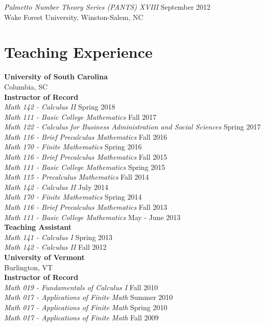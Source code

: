 \documentclass{article}
\begin{document}
  \noindent\textsl{Palmetto Number Theory Series (PANTS) XVIII} \hfill September 2012\\
  Wake Forest University, Winston-Salem, NC\\

  \section*{Teaching Experience}
  \textbf{University of South Carolina}\\Columbia, SC\\
  
  \noindent\textbf{Instructor of Record}\\
  \textsl{Math 142 - Calculus II} \hfill Spring 2018\\
  \textsl{Math 111 - Basic College Mathematics} \hfill Fall 2017\\
  \textsl{Math 122 - Calculus for Business Administration and Social Sciences} \hfill Spring 2017\\
  \textsl{Math 116 - Brief Precalculus Mathematics} \hfill Fall 2016\\
  \textsl{Math 170 - Finite Mathematics} \hfill Spring 2016\\
  \textsl{Math 116 - Brief Precalculus Mathematics} \hfill Fall 2015\\
  \textsl{Math 111 - Basic College Mathematics} \hfill Spring 2015\\
  \textsl{Math 115 - Precalculus Mathematics} \hfill Fall 2014\\
  \textsl{Math 142 - Calculus II} \hfill July 2014\\
  \textsl{Math 170 - Finite Mathematics} \hfill Spring 2014\\
  \textsl{Math 116 - Brief Precalculus Mathematics} \hfill Fall 2013\\
  \textsl{Math 111 - Basic College Mathematics} \hfill May - June 2013\\

  \noindent\textbf{Teaching Assistant}\\
  \textsl{Math 141 - Calculus I} \hfill Spring 2013\\
  \textsl{Math 142 - Calculus II} \hfill Fall 2012\\

  \noindent\textbf{University of Vermont}\\Burlington, VT\\
  
  \noindent\textbf{Instructor of Record}\\
  \textsl{Math 019 - Fundamentals of Calculus I} \hfill Fall 2010\\
  \textsl{Math 017 - Applications of Finite Math} \hfill Summer 2010\\
  \textsl{Math 017 - Applications of Finite Math} \hfill Spring 2010\\
  \textsl{Math 017 - Applications of Finite Math} \hfill Fall 2009\\
  
\end{document}

